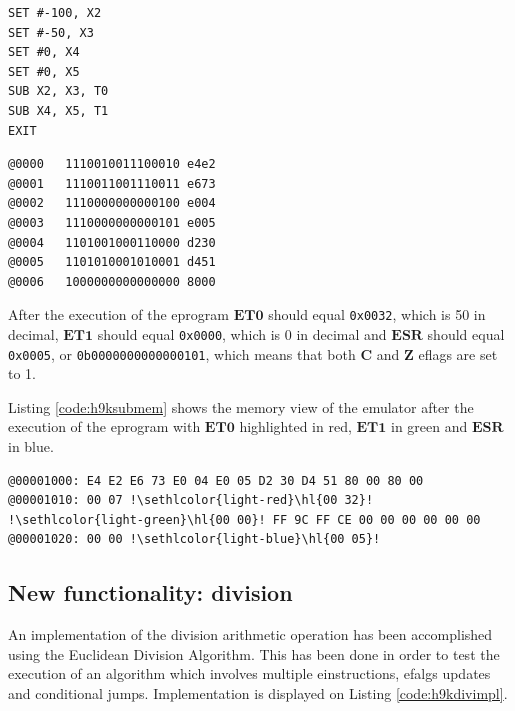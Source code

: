 \documentclass[11pt, a4paper]{article}
\begin{document}
\noindent
\begin{minipage}{.40\textwidth}
	\begin{lstlisting}[style=customasm, caption={HAL9000 SUB test code}, label={code:h9ktestsub}]
SET #-100, X2
SET #-50, X3
SET #0, X4
SET #0, X5
SUB X2, X3, T0
SUB X4, X5, T1
EXIT
	\end{lstlisting}
\end{minipage}
\hfill
\begin{minipage}{.55\textwidth}
	\begin{lstlisting}[style=customasm, caption={HAL9000 assembled SUB test code}, label={code:h9ktestsubasm}]
@0000   1110010011100010 e4e2
@0001   1110011001110011 e673
@0002   1110000000000100 e004
@0003   1110000000000101 e005
@0004   1101001000110000 d230
@0005   1101010001010001 d451
@0006   1000000000000000 8000
	\end{lstlisting}
\end{minipage}

After the execution of the eprogram $\mathbf{ET0}$ should equal \verb|0x0032|, which is 50 in
decimal, $\mathbf{ET1}$ should equal \verb|0x0000|, which is 0 in decimal and
$\mathbf{ESR}$ should equal \verb|0x0005|, or \verb|0b0000000000000101|, which means that both $\mathbf{C}$ and
$\mathbf{Z}$ eflags are set to 1.

Listing \ref{code:h9ksubmem} shows the memory view of the emulator after the execution of the
eprogram with $\mathbf{ET0}$ highlighted in red, $\mathbf{ET1}$ in green and $\mathbf{ESR}$ in blue.
\begin{lstlisting}[style=customasm, caption={HAL9000 ESUB test code memory view},
	label={code:h9ksubmem}, escapechar=!, columns=fullflexible]
@00001000: E4 E2 E6 73 E0 04 E0 05 D2 30 D4 51 80 00 80 00
@00001010: 00 07 !\sethlcolor{light-red}\hl{00 32}! !\sethlcolor{light-green}\hl{00 00}! FF 9C FF CE 00 00 00 00 00 00
@00001020: 00 00 !\sethlcolor{light-blue}\hl{00 05}!
\end{lstlisting}

\subsection{New functionality: division}
An implementation of the division arithmetic operation has been accomplished using the Euclidean
Division Algorithm. This has been done in order to test the execution of an algorithm which involves
multiple einstructions, efalgs updates and conditional jumps. Implementation is displayed on Listing \ref{code:h9kdivimpl}.
\end{document}
